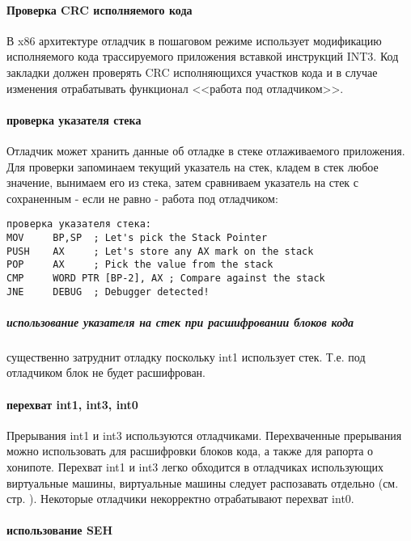 \paragraph{Проверка CRC исполняемого кода\\}
В x86 архитектуре отладчик в пошаговом режиме использует модификацию исполняемого кода трассируемого приложения вставкой инструкций INT3. Код закладки должен проверять CRC
исполняющихся участков кода и в случае изменения отрабатывать функционал <<работа под отладчиком>>.

\paragraph{проверка указателя стека\\}
Отладчик может хранить данные об отладке в стеке отлаживаемого приложения. Для проверки
запоминаем текущий указатель на стек, кладем в стек любое значение, вынимаем его из стека,
затем сравниваем указатель на стек с сохраненным - если не равно - работа под отладчиком:
\begin{verbatim}
проверка указателя стека:
MOV     BP,SP  ; Let's pick the Stack Pointer
PUSH    AX     ; Let's store any AX mark on the stack
POP     AX     ; Pick the value from the stack
CMP     WORD PTR [BP-2], AX ; Compare against the stack
JNE     DEBUG  ; Debugger detected!
\end{verbatim}
\subparagraph{использование указателя на стек при расшифровании блоков кода} существенно затруднит отладку поскольку int1 использует стек. Т.е. под отладчиком блок не будет
расшифрован.

\paragraph{перехват int1, int3, int0\\}
Прерывания int1 и int3 используются отладчиками. Перехваченные прерывания можно использовать для
расшифровки блоков кода, а также для рапорта о хонипоте. Перехват int1 и int3 легко
обходится в отладчиках использующих виртуальные машины, виртуальные машины следует
распозавать отдельно (см. стр. \pageref{vm_detection}). Некоторые отладчики некорректно
отрабатывают перехват int0.

\paragraph{использование SEH\\}


